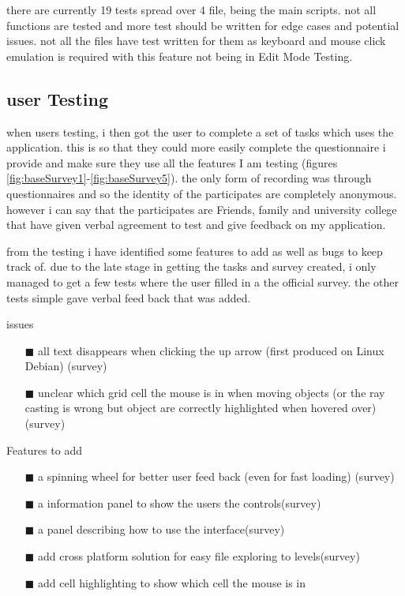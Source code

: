 there are currently 19 tests spread over 4 file, being the main scripts. not all functions are tested and more test should be written for edge cases and potential issues. not all the files have test written for them as keyboard and mouse click emulation is required with this feature not being in Edit Mode Testing.


\subsection{user Testing}
when users testing, i then got the user to complete a set of tasks which uses the application. this is so that they could more easily complete the questionnaire i provide and make sure they use all the features I am testing (figures \ref{fig:baseSurvey1}-\ref{fig:baseSurvey5}). the only form of recording was through questionnaires and so the identity of the participates are completely anonymous. however i can say that the participates are Friends, family and university college that have given verbal agreement to test and give feedback on my application.

from the testing i have identified some features to add as well as bugs to keep track of. due to the late stage in getting the tasks and survey created, i only managed to get a few tests where the user filled in a the official survey. the other tests simple gave verbal feed back that was added.

issues
\begin{enumerate}
  \item[$\blacksquare$] all text disappears when clicking the up arrow (first produced on Linux Debian) (survey)
  \item[$\blacksquare$] unclear which grid cell the mouse is in when moving objects (or the ray casting is wrong but object are correctly highlighted when hovered over)(survey)
\end{enumerate}
Features to add
\begin{enumerate}
  \item[$\blacksquare$] a spinning wheel for better user feed back (even for fast loading) (survey)
  \item[$\blacksquare$] a information panel to show the users the controls(survey)
  \item[$\blacksquare$] a panel describing how to use the interface(survey)
  \item[$\blacksquare$] add cross platform solution for easy file exploring to levels(survey)
  \item[$\blacksquare$] add cell highlighting to show which cell the mouse is in
\end{enumerate}



